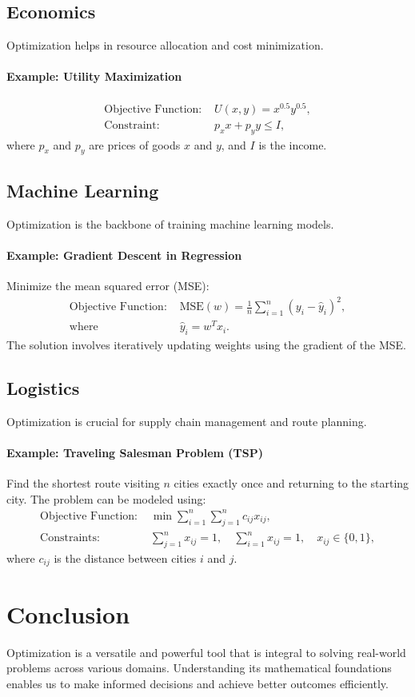 \documentclass[a4paper,12pt]{article}
\begin{document}
\subsection{Economics}
Optimization helps in resource allocation and cost minimization.
\paragraph{Example: Utility Maximization}
\begin{align*}
\text{Objective Function: } & U(x, y) = x^{0.5}y^{0.5}, \\
\text{Constraint: } & p_x x + p_y y \leq I,
\end{align*}
where $p_x$ and $p_y$ are prices of goods $x$ and $y$, and $I$ is the income.

\subsection{Machine Learning}
Optimization is the backbone of training machine learning models.
\paragraph{Example: Gradient Descent in Regression}
Minimize the mean squared error (MSE):
\begin{align*}
\text{Objective Function: } & \text{MSE}(w) = \frac{1}{n} \sum_{i=1}^n (y_i - \hat{y}_i)^2, \\
\text{where } & \hat{y}_i = w^T x_i.
\end{align*}
The solution involves iteratively updating weights using the gradient of the MSE.

\subsection{Logistics}
Optimization is crucial for supply chain management and route planning.
\paragraph{Example: Traveling Salesman Problem (TSP)}
Find the shortest route visiting $n$ cities exactly once and returning to the starting city. The problem can be modeled using:
\begin{align*}
\text{Objective Function: } & \min \sum_{i=1}^n \sum_{j=1}^n c_{ij} x_{ij}, \\
\text{Constraints: } & \sum_{j=1}^n x_{ij} = 1, \quad \sum_{i=1}^n x_{ij} = 1, \quad x_{ij} \in \{0, 1\},
\end{align*}
where $c_{ij}$ is the distance between cities $i$ and $j$.

\section{Conclusion}
Optimization is a versatile and powerful tool that is integral to solving real-world problems across various domains. Understanding its mathematical foundations enables us to make informed decisions and achieve better outcomes efficiently.
\end{document}
